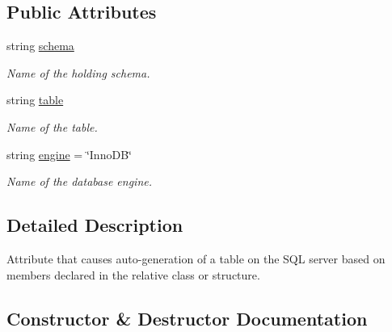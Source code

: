 \subsection*{Public Attributes}
\begin{DoxyCompactItemize}
\item 
string \mbox{\hyperlink{class_uniform_data_operator_1_1_sql_1_1_markup_1_1_table_attribute_ac0f169e34020d96155a9fd961b207391}{schema}}
\begin{DoxyCompactList}\small\item\em Name of the holding schema. \end{DoxyCompactList}\item 
string \mbox{\hyperlink{class_uniform_data_operator_1_1_sql_1_1_markup_1_1_table_attribute_afbaa6ebc381e83a2be76e904f417d7ac}{table}}
\begin{DoxyCompactList}\small\item\em Name of the table. \end{DoxyCompactList}\item 
string \mbox{\hyperlink{class_uniform_data_operator_1_1_sql_1_1_markup_1_1_table_attribute_a6dd17faa4c4e02428620528929a2d497}{engine}} = \char`\"{}Inno\+DB\char`\"{}
\begin{DoxyCompactList}\small\item\em Name of the database engine. \end{DoxyCompactList}\end{DoxyCompactItemize}


\subsection{Detailed Description}
Attribute that causes auto-\/generation of a table on the S\+QL server based on members declared in the relative class or structure. 



\subsection{Constructor \& Destructor Documentation}
\mbox{\label{class_uniform_data_operator_1_1_sql_1_1_markup_1_1_table_attribute_a3cfe088f4e36ab209cec341c10917ff6}} 
